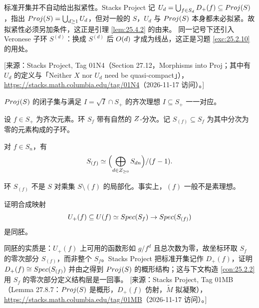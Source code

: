 \begin{yizhu}
标准开集并不自动给出拟紧性。Stacks Project 记 $U_d = \bigcup_{f \in S_d} D_+(f) \subseteq Proj(S)$，指出 $Proj(S) = \bigcup_{d \ge 1} U_d$，但对一般的 $S$，$U_d$ 与 $Proj(S)$ 本身都未必拟紧。故拟紧性必须另加条件，这正是引理 \ref{lem:25.4.2} 的由来。
同一记号下还引入 Veronese 子环 $S^{(d)}$：换成 $S^{(d)}$ 后 $O(d)$ 才成为线丛，这正是习题 \ref{exc:25.2.10} 的用处。

[来源：Stacks Project, Tag 01N4（Section 27.12，Morphisms into Proj；其中有 $U_d$ 的定义与「Neither $X$ nor $U_d$ need be quasi-compact」），\url{https://stacks.math.columbia.edu/tag/01N4}（2026-11-17 访问）。]
\end{yizhu}

\begin{corollary}\label{cor:25.1.7}
$Proj(S)$ 的闭子集与满足 $I = \sqrt{I} \cap S_+$ 的齐次理想 $I \subseteq S_+$ 一一对应。
\end{corollary}

\begin{notation}\label{not:25.1.8}
设 $f \in S_+$ 为齐次元素。环 $S_f$ 带有自然的 $Z$-分次。记 $S_{(f)} \subseteq S_f$ 为其中分次为零的元素构成的子环。
\end{notation}

\begin{remark}\label{rem:25.1.9}
对 $f \in S_n$，有
\[
S_{(f)} \simeq \Bigl(\bigoplus_{d \in Z_{\ge 0}} S_{dn}\Bigr)/(f-1).
\]
\end{remark}

\begin{warning}\label{warn:25.1.10}
环 $S_{(f)}$ 不是 $S$ 对乘集 $S \setminus (f)$ 的局部化。事实上，$(f)$ 一般不是素理想。
\end{warning}

\begin{exercise}\label{exc:25.1.11}
证明合成映射
\[
U_+(f) \subseteq U(f) \simeq Spec(S_f) \to Spec(S_{(f)})
\]
是同胚。
\end{exercise}

\begin{yizhu}
同胚的实质是：$U_+(f)$ 上可用的函数形如 $g/f^d$ 且总次数为零，故坐标环取 $S_f$ 的零次部分 $S_{(f)}$，而非整个 $S_f$。Stacks Project 把标准开集记作 $D_+(f)$，证明 $D_+(f) \cong Spec(S_{(f)})$ 并由之得到 $Proj(S)$ 的概形结构；这与下文构造 \ref{con:25.2.2} 用 $S_f$ 的零次部分定义结构层是一回事。
[来源：Stacks Project, Tag 01MB（Lemma 27.8.7：$Proj(S)$ 是概形，$D_+(f)$ 仿射，$\widetilde{M}$ 拟凝聚），\url{https://stacks.math.columbia.edu/tag/01MB}（2026-11-17 访问）。]
\end{yizhu}

